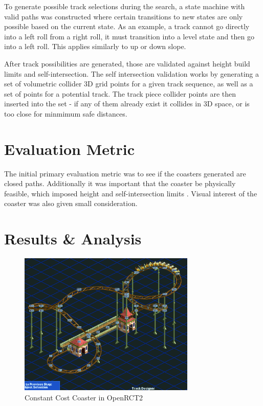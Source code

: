 \documentclass[12pt]{article}
\begin{document}
To generate possible track selections during the search, a state machine with valid paths was constructed where certain transitions to new states are only possible based on the current state.
As an example, a track cannot go directly into a left roll from a right roll, it must transition into a level state and then go into a left roll. This applies similarly to up or down slope.

After track possibilities are generated, those are validated against height build limits and self-intersection. The self intersection validation works by generating a set of volumetric collider 3D grid points for a given track sequence, as well as a set of points for a potential track.
The track piece collider points are then inserted into the set - if any of them already exist it collides in 3D space, or is too close for minmimum safe distances.

\section*{Evaluation Metric}
The initial primary evaluation metric was to see if the coasters generated are closed paths. Additionally it was important that the coaster be physically feasible, which imposed height and self-intersection limits . Visual interest of the coaster was also given small consideration.
\section*{Results \& Analysis}
\begin{figure}[h]
    \caption{Constant Cost Coaster in OpenRCT2}
    \centering
    \includegraphics[width=0.75\textwidth]{coaster_constantcost}
\end{figure}
\end{document}
